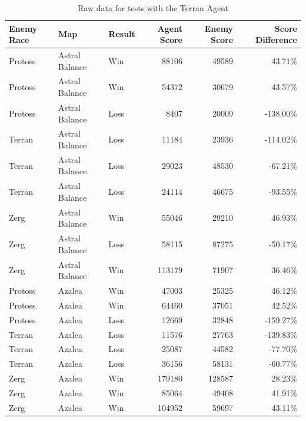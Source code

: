 \documentclass[11pt,openright,a4paper]{report}
\begin{document}
\begin{table}[h]
  \centering
  \begin{tabular}{| l | l | l | r | r | r |}
    \hline
    Enemy Race & Map & Result & Agent Score & Enemy Score & Score Difference \\ \hline
    Protoss & Astral Balance & Win & 88106 & 49589 & 43.71\% \\ \hline
    Protoss & Astral Balance & Win & 54372 & 30679 & 43.57\% \\ \hline
    Protoss & Astral Balance & Loss & 8407 & 20009 & -138.00\% \\ \hline
    Terran & Astral Balance & Loss & 11184 & 23936 & -114.02\% \\ \hline
    Terran & Astral Balance & Loss & 29023 & 48530 & -67.21\% \\ \hline
    Terran & Astral Balance & Loss & 24114 & 46675 & -93.55\% \\ \hline
    Zerg & Astral Balance & Win & 55046 & 29210 & 46.93\% \\ \hline
    Zerg & Astral Balance & Loss & 58115 & 87275 & -50.17\% \\ \hline
    Zerg & Astral Balance & Win & 113179 & 71907 & 36.46\% \\ \hline
    Protoss & Azalea & Win & 47003 & 25325 & 46.12\% \\ \hline
    Protoss & Azalea & Win & 64460 & 37051 & 42.52\% \\ \hline
    Protoss & Azalea & Loss & 12669 & 32848 & -159.27\% \\ \hline
    Terran & Azalea & Loss & 11576 & 27763 & -139.83\% \\ \hline
    Terran & Azalea & Loss & 25087 & 44582 & -77.70\% \\ \hline
    Terran & Azalea & Loss & 36156 & 58131 & -60.77\% \\ \hline
    Zerg & Azalea & Win & 179180 & 128587 & 28.23\% \\ \hline
    Zerg & Azalea & Win & 85064 & 49408 & 41.91\% \\ \hline
    Zerg & Azalea & Win & 104952 & 59697 & 43.11\% \\ \hline
  \end{tabular}
  \caption{Raw data for tests with the Terran Agent}\label{DataRawTerran}
\end{table}
\end{document}
